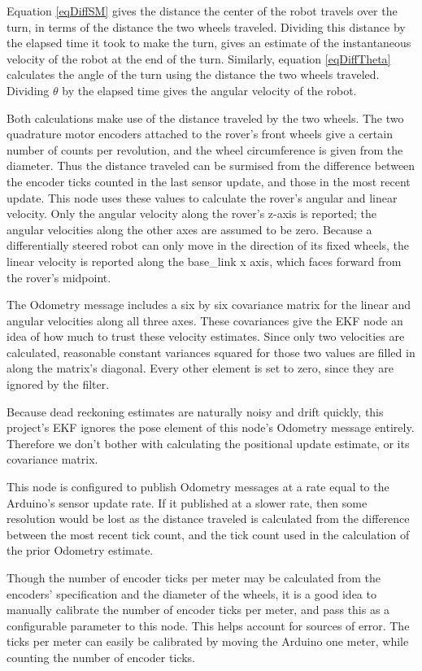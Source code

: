 Equation \ref{eqDiffSM} gives the distance the center of the robot travels over the turn, in terms of the distance the two wheels traveled. Dividing this distance by the elapsed time it took to make the turn, gives an estimate of the instantaneous velocity of the robot at the end of the turn. Similarly, equation \ref{eqDiffTheta} calculates the angle of the turn using the distance the two wheels traveled. Dividing \(\theta\) by the elapsed time gives the angular velocity of the robot.

Both calculations make use of the distance traveled by the two wheels. The two quadrature motor encoders attached to the rover's front wheels give a certain number of counts per revolution, and the wheel circumference is given from the diameter. Thus the distance traveled can be surmised from the difference between the encoder ticks counted in the last sensor update, and those in the most recent update. This node uses these values to calculate the rover's angular and linear velocity. Only the angular velocity along the rover's z-axis is reported; the angular velocities along the other axes are assumed to be zero. Because a differentially steered robot can only move in the direction of its fixed wheels, the linear velocity is reported along the base\_link x axis, which faces forward from the rover's midpoint.

The Odometry message includes a six by six covariance matrix for the linear and angular velocities along all three axes. These covariances give the EKF node an idea of how much to trust these velocity estimates. Since only two velocities are calculated, reasonable constant variances squared for those two values are filled in along the matrix's diagonal. Every other element is set to zero, since they are ignored by the filter. 

Because dead reckoning estimates are naturally noisy and drift quickly, this project's EKF ignores the pose element of this node's Odometry message entirely. Therefore we don't bother with calculating the positional update estimate, or its covariance matrix.

This node is configured to publish Odometry messages at a rate equal to the Arduino's sensor update rate. If it published at a slower rate, then some resolution would be lost as the distance traveled is calculated from the difference between the most recent tick count, and the tick count used in the calculation of the prior Odometry estimate.

Though the number of encoder ticks per meter may be calculated from the encoders' specification and the diameter of the wheels, it is a good idea to manually calibrate the number of encoder ticks per meter, and pass this as a configurable parameter to this node. This helps account for sources of error. The ticks per meter can easily be calibrated by moving the Arduino one meter, while counting the number of encoder ticks.

